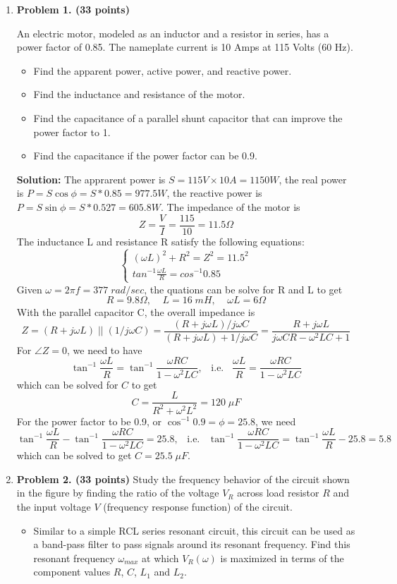 \begin{enumerate}

\item {\bf Problem 1. (33 points)} 

An electric motor, modeled as an inductor and a resistor in series, has 
a power factor of 0.85. The nameplate current is 10 Amps at 115 Volts 
(60 Hz). 
\begin{itemize}
\item Find the apparent power, active power, and reactive power. 
\item Find the inductance and resistance of the motor.
\item Find the capacitance of a parallel shunt capacitor that can improve
	the power factor to 1.
\item Find the capacitance if the power factor can be 0.9.
\end{itemize}

{\bf Solution:} 
The apprarent power is $S=115V \times 10A = 1150 W$, the real power is
$P=S\cos \phi=S*0.85=977.5 W$, the reactive power is 
$P=S\sin \phi=S*0.527=605.8 W$. The impedance of the motor is
\[	Z=\frac{V}{I}=\frac{115}{10}=11.5\Omega \]
The inductance L and resistance R satisfy the following equations:
\[ \left\{ \begin{array}{l} (\omega L)^2+R^2=Z^2=11.5^2 \\
	tan^{-1} \frac{\omega L}{R}=cos^{-1} 0.85 \end{array} \right. \]
Given $\omega=2\pi f=377\;rad/sec$, the quations can be solve for R and
L to get
\[	R=9.8\Omega,\;\;\;\;L=16\;mH,\;\;\;\;\omega L=6\Omega	\]
With the parallel capacitor C, the overall impedance is
\[	Z=(R+j\omega L)\; || \;(1/j\omega C)
	=\frac{(R+j\omega L)/j\omega C}{(R+j\omega L)+1/j\omega C}
	=\frac{R+j\omega L}{j\omega CR-\omega^2 LC+1}	\]
For $\angle Z=0$, we need to have
\[ \tan^{-1}\frac{\omega L}{R}=\tan^{-1}\frac{\omega RC}{1-\omega^2 LC},
	\;\;\;\mbox{i.e.}\;\;\;	
	\frac{\omega L}{R}=\frac{\omega RC}{1-\omega^2 LC}	\]
which can be solved for $C$ to get
\[	C=\frac{L}{R^2+\omega^2 L^2}=120\;\mu F	\]
For the power factor to be 0.9, or $\cos^{-1} 0.9=\phi=25.8$, we need
\[ \tan^{-1}\frac{\omega L}{R}-\tan^{-1}\frac{\omega RC}{1-\omega^2 LC}
	=25.8,	\;\;\;\mbox{i.e.}\;\;\;	
\tan^{-1}\frac{\omega RC}{1-\omega^2 LC}=\tan^{-1}\frac{\omega L}{R}-25.8=
	5.8 \]
which can be solved to get $C=25.5\;\mu F$.


\item {\bf Problem 2. (33 points)} Study the frequency behavior of the
circuit shown in the figure by finding the ratio of the voltage $V_R$
across load resistor $R$ and the input voltage $V$ (frequency response
function) of the circuit. 
\begin{itemize}
\item Similar to a simple RCL series resonant circuit, this circuit
can be used as a band-pass filter to pass signals around its resonant 
frequency. Find this resonant frequency $\omega_{max}$ at which 
$V_R(\omega)$ is maximized in terms of the component values $R$, $C$, 
$L_1$ and $L_2$. 


\end{itemize}
\end{enumerate}
